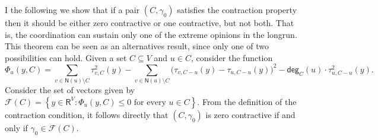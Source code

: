 \documentclass[letterpaper,11pt]{article}
\newcommand{\calF}{\mathcal{F}}
\newcommand{\RR}{\mathsf{R}}
\newcommand{\nsf}{\mathsf{N}}
\newcommand{\degsf}{\mathsf{deg}}
\begin{document}
I the following we show that if a pair $(C,\gamma_0)$ satisfies the contraction property then it should be either zero contractive or one contractive, but not both.
That is, the coordination can sustain only one of the extreme opinions in the longrun.
This theorem can be seen as an alternatives result, since only one of two possibilities can hold.
Given a set $C\subseteq V$ and $u\in C$, consider the function 
\begin{equation*}
\Phi_u(y,C)= \sum_{v\in \nsf(u)\setminus C}\tau^2_{v,C}(y)-\sum_{v\in \nsf(u)\setminus C}\Big(\tau_{v,C-u}(y)-\tau_{u,C-u}(y)\Big)^2 -\degsf_C(u)\cdot \tau^2_{u,C-u}(y).
\end{equation*}
Consider the set of vectors given by $\calF(C)=\left\{y\in \RR^V:\Phi_u(y,C)\le 0\text{ for every }u\in C\right\}$.
From the definition of the contraction condition, it follows directly that $(C,\gamma_0)$ is zero contractive if and only if $\gamma_0\in \calF(C)$.
\end{document}
